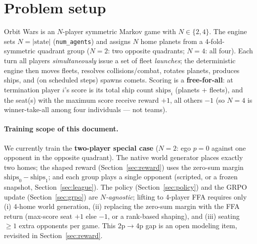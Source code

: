 \documentclass[11pt]{article}
\begin{document}
\section{Problem setup}\label{sec:problem}
Orbit Wars is an $N$-player symmetric Markov game with $N\in\{2,4\}$. The engine sets
$N=\lvert\text{state}\rvert$ (\texttt{num\_agents}) and assigns $N$ home planets from a
4-fold-symmetric quadrant group ($N=2$: two opposite quadrants; $N=4$: all four). Each turn all
players \emph{simultaneously} issue a set of fleet \emph{launches}; the deterministic engine then
moves fleets, resolves collisions/combat, rotates planets, produces ships, and (on scheduled
steps) spawns comets. Scoring is a \textbf{free-for-all}: at termination player $i$'s score is its
total ship count $\mathrm{ships}_i$ (planets $+$ fleets), and the seat(s) with the maximum score
receive reward $+1$, all others $-1$ (so $N=4$ is winner-take-all among four individuals --- not
teams).

\paragraph{Training scope of this document.} We currently train the \textbf{two-player special
case} ($N=2$: ego $p=0$ against one opponent in the opposite quadrant). The native world generator
places exactly two homes; the shaped reward (Section~\ref{sec:reward}) uses the zero-sum margin
$\mathrm{ships}_0-\mathrm{ships}_1$; and each group plays a single opponent (scripted, or a frozen
snapshot, Section~\ref{sec:league}). The policy (Section~\ref{sec:policy}) and the GRPO update
(Section~\ref{sec:grpo}) are \emph{$N$-agnostic}; lifting to 4-player FFA requires only (i) 4-home
world generation, (ii) replacing the zero-sum margin with the FFA return (max-score seat $+1$ else
$-1$, or a rank-based shaping), and (iii) seating $\geq 1$ extra opponents per game. This 2p$\to$4p
gap is an open modeling item, revisited in Section~\ref{sec:reward}.
\end{document}

